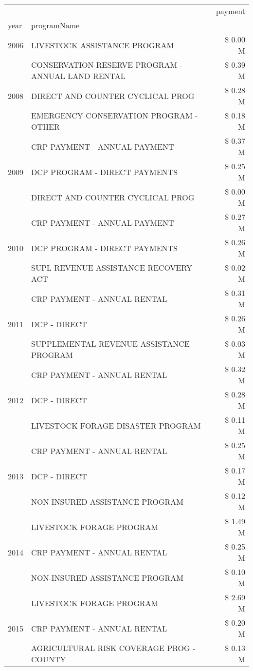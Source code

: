 \begin{tabular}{llr}
\toprule
 &  & payment \\
year & programName &  \\
\midrule
2006 & LIVESTOCK ASSISTANCE PROGRAM & \$ 0.00 M \\
\cline{1-3}
\multirow[t]{3}{*}{2008} & CONSERVATION RESERVE PROGRAM - ANNUAL LAND RENTAL & \$ 0.39 M \\
 & DIRECT AND COUNTER CYCLICAL PROG & \$ 0.28 M \\
 & EMERGENCY CONSERVATION PROGRAM - OTHER & \$ 0.18 M \\
\cline{1-3}
\multirow[t]{3}{*}{2009} & CRP PAYMENT - ANNUAL PAYMENT & \$ 0.37 M \\
 & DCP PROGRAM - DIRECT PAYMENTS & \$ 0.25 M \\
 & DIRECT AND COUNTER CYCLICAL PROG & \$ 0.00 M \\
\cline{1-3}
\multirow[t]{3}{*}{2010} & CRP PAYMENT - ANNUAL PAYMENT & \$ 0.27 M \\
 & DCP PROGRAM - DIRECT PAYMENTS & \$ 0.26 M \\
 & SUPL REVENUE ASSISTANCE RECOVERY ACT & \$ 0.02 M \\
\cline{1-3}
\multirow[t]{3}{*}{2011} & CRP PAYMENT - ANNUAL RENTAL & \$ 0.31 M \\
 & DCP - DIRECT & \$ 0.26 M \\
 & SUPPLEMENTAL REVENUE ASSISTANCE PROGRAM & \$ 0.03 M \\
\cline{1-3}
\multirow[t]{3}{*}{2012} & CRP PAYMENT - ANNUAL RENTAL & \$ 0.32 M \\
 & DCP - DIRECT & \$ 0.28 M \\
 & LIVESTOCK FORAGE DISASTER PROGRAM & \$ 0.11 M \\
\cline{1-3}
\multirow[t]{3}{*}{2013} & CRP PAYMENT - ANNUAL RENTAL & \$ 0.25 M \\
 & DCP - DIRECT & \$ 0.17 M \\
 & NON-INSURED ASSISTANCE PROGRAM & \$ 0.12 M \\
\cline{1-3}
\multirow[t]{3}{*}{2014} & LIVESTOCK FORAGE PROGRAM & \$ 1.49 M \\
 & CRP PAYMENT - ANNUAL RENTAL & \$ 0.25 M \\
 & NON-INSURED ASSISTANCE PROGRAM & \$ 0.10 M \\
\cline{1-3}
\multirow[t]{3}{*}{2015} & LIVESTOCK FORAGE PROGRAM & \$ 2.69 M \\
 & CRP PAYMENT - ANNUAL RENTAL & \$ 0.20 M \\
 & AGRICULTURAL RISK COVERAGE PROG - COUNTY & \$ 0.13 M \\

\end{tabular}
